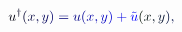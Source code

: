 \documentclass[12pt]{article}
\begin{document}
\makeatletter
\renewcommand*{\@textcolor}[3]{%
  \protect\leavevmode
  \begingroup
    \color#1{#2}#3%
  \endgroup
}
\makeatother
\begin{displaymath}
\mathcolor[RGB]{0,0,15}{u} ^ { \mathcolor[RGB]{0,0,30}{\dag} } \mathcolor[RGB]{0,0,45}{(} \mathcolor[RGB]{0,0,60}{x} \mathcolor[RGB]{0,0,75}{,} \mathcolor[RGB]{0,0,90}{y} \mathcolor[RGB]{0,0,105}{)} \mathcolor[RGB]{0,0,120}{=} \mathcolor[RGB]{0,0,135}{u} \mathcolor[RGB]{0,0,150}{(} \mathcolor[RGB]{0,0,165}{x} \mathcolor[RGB]{0,0,180}{,} \mathcolor[RGB]{0,0,195}{y} \mathcolor[RGB]{0,0,210}{)} \mathcolor[RGB]{0,0,225}{+} \mathcolor[RGB]{0,0,240}{\tilde { \mathcolor[RGB]{0,0,255}{u} } } \mathcolor[RGB]{0,15,0}{(} \mathcolor[RGB]{0,15,15}{x} \mathcolor[RGB]{0,15,30}{,} \mathcolor[RGB]{0,15,45}{y} \mathcolor[RGB]{0,15,60}{)} \mathcolor[RGB]{0,15,75}{,}
\end{displaymath}
\end{document}
